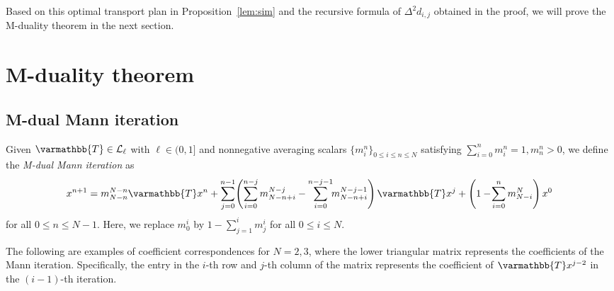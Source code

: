 \documentclass[pdflatex,sn-mathphys-num]{sn-jnl}%
\newcommand{\cL}{\mathcal{L}}
\newcommand{\opT}{{\varmathbb{T}}}
\theoremstyle{thmstyleone}%
\theoremstyle{thmstyletwo}%
\theoremstyle{thmstylethree}%
\begin{document}

Based on this optimal transport plan in Proposition~\ref{lem:sim} and the recursive formula of $\Delta^2 d_{i,j}$ obtained in the proof, we will prove the M-duality theorem in the next section.


\section{M-duality theorem}
\subsection{M-dual Mann iteration}
Given $\opT\in \cL_\ell$ with $\ell \in(0,1]$ and nonnegative averaging scalars 
$\{m^n_i\}_{0 \le i \le n \le N}$ satisfying $\sum^n_{i=0}m^n_i=1, m^n_n>0$, we define the \emph{M-dual Mann iteration} as
\begin{align*}
\!
x^{n+1}= \mbox{$m^{\tiny{N-n}}_{N-n}$}\opT x^n + \sum^{n-1}_{j=0} \!\left(\sum^{n-j}_{i=0} m^{N-j}_{N-n+i}- 
\sum^{n-j-1}_{i=0} \!\!m^{N-j-1}_{N-n+i} \right)\opT x^{j}  +\left(1-\!\sum^n_{i=0} m^{N}_{N-i}\right)x^0
\end{align*}
for all $0 \le n \le N-1$. Here, we replace $m^i_0$ by $1-\sum^i_{j=1}m^i_j$ for all $0\le i \le N$.

The following are examples of coefficient correspondences for $N=2,3$, where the lower triangular matrix represents the coefficients of the Mann iteration. Specifically, the entry in the $i$-th row and $j$-th column of the matrix represents the coefficient of $\opT x^{j-2}$ in the $(i-1)$-th iteration.
\end{document}
